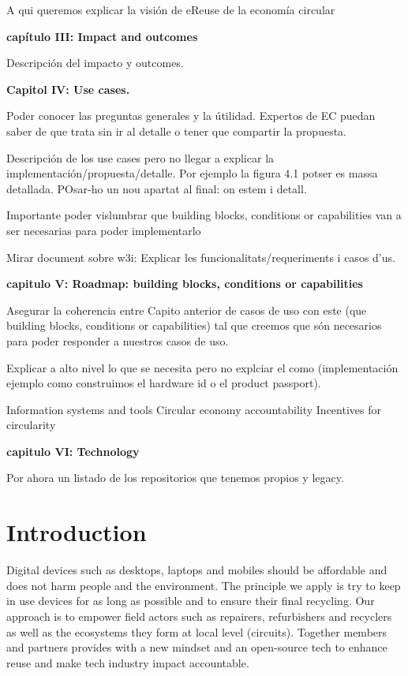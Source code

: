 \documentclass[
]{book}
\begin{document}
A qui queremos explicar la visión de eReuse de la economía circular

\textbf{capítulo III: Impact and outcomes}

Descripción del impacto y outcomes.

\textbf{Capitol IV: Use cases.}

Poder conocer las preguntas generales y la útilidad. Expertos de EC puedan saber de que trata sin ir al detalle o tener que compartir la propuesta.

Descripción de los use cases pero no llegar a explicar la implementación/propuesta/detalle. Por ejemplo la figura 4.1 potser es massa detallada. POsar-ho un nou apartat al final: on estem i detall.

Importante poder vislumbrar que building blocks, conditions or capabilities van a ser necesarias para poder implementarlo

Mirar document sobre w3i: Explicar les funcionalitats/requeriments i casos d'us.

\textbf{capitulo V: Roadmap: building blocks, conditions or capabilities}

Asegurar la coherencia entre Capito anterior de casos de uso con este (que building blocks, conditions or capabilities) tal que creemos que són necesarios para poder responder a nuestros casos de uso.

Explicar a alto nivel lo que se necesita pero no explciar el como (implementación ejemplo como construimos el hardware id o el product passport).

Information systems and tools
Circular economy accountability
Incentives for circularity

\textbf{capitulo VI: Technology}

Por ahora un listado de los repositorios que tenemos propios y legacy.

\hypertarget{introduction}{%
\chapter{Introduction}\label{introduction}}

Digital devices such as desktops, laptops and mobiles should be affordable and does not harm people and the environment. The principle we apply is try to keep in use devices for as long as possible and to ensure their final recycling. Our approach is to empower field actors such as repairers, refurbishers and recyclers as well as the ecosystems they form at local level (circuits). Together members and partners provides with a new mindset and an open-source tech to enhance reuse and make tech industry impact accountable.
\end{document}
